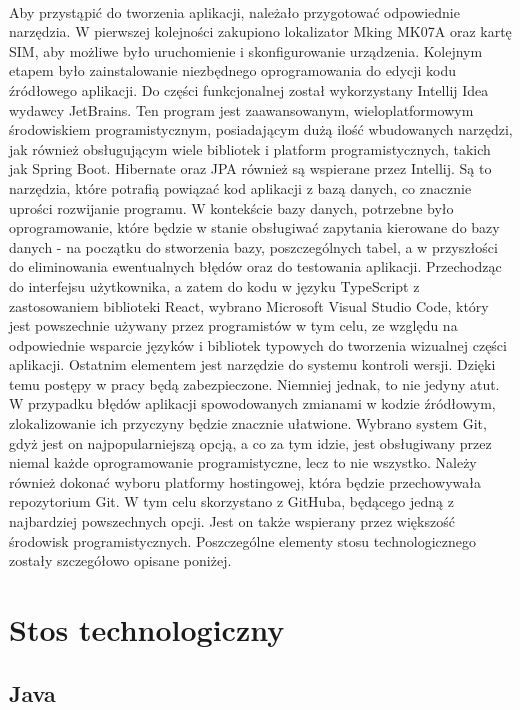 \paragraph{}
Aby przystąpić do tworzenia aplikacji, należało przygotować odpowiednie narzędzia. W pierwszej kolejności zakupiono lokalizator Mking MK07A oraz kartę SIM, aby możliwe było uruchomienie i skonfigurowanie urządzenia. Kolejnym etapem było zainstalowanie niezbędnego oprogramowania do edycji kodu źródłowego aplikacji. Do części funkcjonalnej został wykorzystany Intellij Idea wydawcy JetBrains. Ten program jest zaawansowanym, wieloplatformowym środowiskiem programistycznym, posiadającym dużą ilość wbudowanych narzędzi, jak również obsługującym wiele bibliotek i platform programistycznych, takich jak Spring Boot. Hibernate oraz JPA również są wspierane przez Intellij. Są to narzędzia, które potrafią powiązać kod aplikacji z bazą danych, co znacznie uprości rozwijanie programu. W kontekście bazy danych, potrzebne było oprogramowanie, które będzie w stanie obsługiwać zapytania kierowane do bazy danych - na początku do stworzenia bazy, poszczególnych tabel, a w przyszłości do eliminowania ewentualnych błędów oraz do testowania aplikacji. Przechodząc do interfejsu użytkownika, a zatem do kodu w języku TypeScript z zastosowaniem biblioteki React, wybrano Microsoft Visual Studio Code, który jest powszechnie używany przez programistów w tym celu, ze względu na odpowiednie wsparcie języków i bibliotek typowych do tworzenia wizualnej części aplikacji. Ostatnim elementem jest narzędzie do systemu kontroli wersji. Dzięki temu postępy w pracy będą zabezpieczone. Niemniej jednak, to nie jedyny atut. W przypadku błędów aplikacji spowodowanych zmianami w kodzie źródłowym, zlokalizowanie ich przyczyny będzie znacznie ułatwione. Wybrano system Git, gdyż jest on najpopularniejszą opcją, a co za tym idzie, jest obsługiwany przez niemal każde oprogramowanie programistyczne, lecz to nie wszystko. Należy również dokonać wyboru platformy hostingowej, która będzie przechowywała repozytorium Git. W tym celu skorzystano z GitHuba, będącego jedną z najbardziej powszechnych opcji. Jest on także wspierany przez większość środowisk programistycznych. Poszczególne elementy stosu technologicznego zostały szczegółowo opisane poniżej.

\section{Stos technologiczny}
\subsection{Java}
